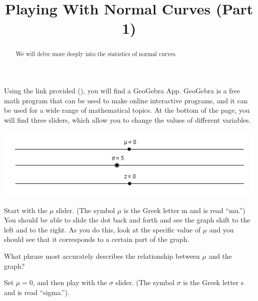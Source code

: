\documentclass{ximera}
\title{Playing With Normal Curves (Part 1)}
\begin{document}
\begin{abstract}
We will delve more deeply into the statistics of normal curves.
\end{abstract}
\maketitle

Using the link provided (), you will find a GeoGebra App. GeoGebra is a free math program that can be used to make online interactive programs, and it can be used for a wide range of mathematical topics. At the bottom of the page, you will find three sliders, which allow you to change the values of different variables.

\begin{center}
\includegraphics[scale=0.75]{Sliders.png}
\end{center}

Start with the $\mu$ slider. (The symbol $\mu$ is the Greek letter m and is read ``mu.'') You should be able to slide the dot back and forth and see the graph shift to the left and to the right. As you do this, look at the specific value of $\mu$ and you should see that it corresponds to a certain part of the graph.

\begin{question}
What phrase most accurately describes the relationship between $\mu$ and the graph?

    \begin{multipleChoice}
    \end{multipleChoice}

\end{question}

Set $\mu = 0$, and then play with the $\sigma$ slider. (The symbol $\sigma$ is the Greek letter s and is read ``sigma.''). 
\end{document}
